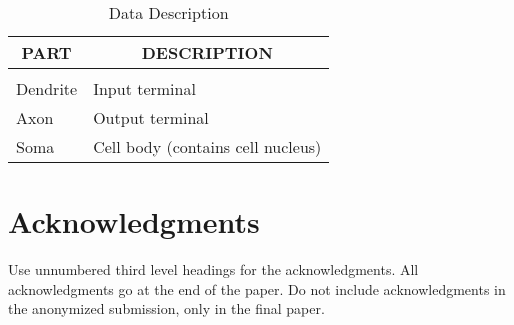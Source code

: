 \documentclass[paper=letter, fontsize=15pt]{article} %
\begin{document}
\begin{table}[t]
\caption{Data Description}
\label{sample-table}
\begin{center}
\begin{tabular}{ll}
\multicolumn{1}{c}{\bf PART}  &\multicolumn{1}{c}{\bf DESCRIPTION}
\\ \hline \\
Dendrite         &Input terminal \\
Axon             &Output terminal \\
Soma             &Cell body (contains cell nucleus) \\
\end{tabular}
\end{center}
\end{table}


\section*{Acknowledgments}

Use unnumbered third level headings for the acknowledgments. All
acknowledgments go at the end of the paper. Do not include 
acknowledgments in the anonymized submission, only in the 
final paper. 

      

\end{document}
